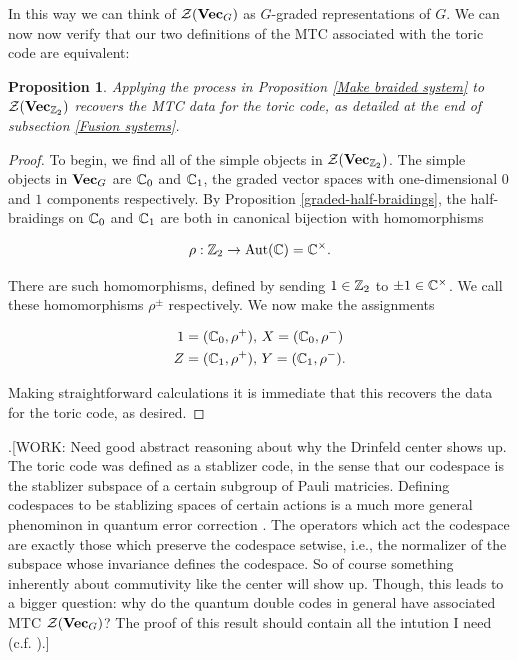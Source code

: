\documentclass{article}
\newtheorem{proposition}{Proposition}[section]
\theoremstyle{definition}
\numberwithin{figure}{section}
\begin{document}
In this way we can think of $\mathcal{Z}(\bold{Vec}_G)$ as $G$-graded representations of $G$. We can now now verify that our two definitions of the MTC associated with the toric code are equivalent:

\begin{proposition} Applying the process in Proposition \ref{Make braided system} to $\mathcal{Z}(\bold{Vec}_{\mathbb{Z}_2})$ recovers the MTC data for the toric code, as detailed at the end of subsection \ref{Fusion systems}.
\end{proposition}
\begin{proof} To begin, we find all of the simple objects in $\mathcal{Z}(\bold{Vec}_{\mathbb{Z}_2})$. The simple objects in $\bold{Vec}_G$ are $\mathbb{C}_0$ and $\mathbb{C}_1$, the graded vector spaces with one-dimensional $0$ and $1$ components respectively. By Proposition \ref{graded-half-braidings}, the half-braidings on $\mathbb{C}_0$ and $\mathbb{C}_1$ are both in canonical bijection with homomorphisms

$$\rho: \mathbb{Z}_2\to \mathrm{Aut}(\mathbb{C})=\mathbb{C}^\times.$$

There are such homomorphisms, defined by sending $1\in \mathbb{Z}_2$ to $\pm 1\in \mathbb{C}^\times$. We call these homomorphisms $\rho^\pm$ respectively. We now make the assignments

\begin{align*}
1=(\mathbb{C}_0,\rho^+),\,\, &X=(\mathbb{C}_0,\rho^-)\\
Z=(\mathbb{C}_1,\rho^+),\,\, &Y=(\mathbb{C}_1,\rho^-).
\end{align*}

Making straightforward calculations it is immediate that this recovers the data for the toric code, as desired.
\end{proof}

.[WORK: Need good abstract reasoning about why the Drinfeld center shows up. The toric code was defined as a stablizer code, in the sense that our codespace is the stablizer subspace of a certain subgroup of Pauli matricies. Defining codespaces to be stablizing spaces of certain actions is a much more general phenominon in quantum error correction \cite{gottesman1997stabilizer}. The operators which act the codespace are exactly those which preserve the codespace setwise, i.e., the normalizer of the subspace whose invariance defines the codespace. So of course something inherently about commutivity like the center will show up. Though, this leads to a bigger question: why do the quantum double codes in general have associated MTC $\mathcal{Z}(\bold{Vec}_G)$? The proof of this result should contain all the intution I need (c.f. \cite{pachos2012introduction}).]
\end{document}
